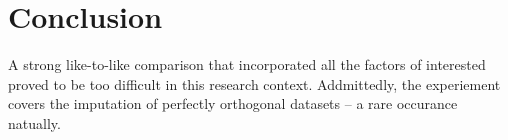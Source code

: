 \documentclass[../paper.tex]{subfiles}
\begin{document}
\section{Conclusion}

A strong like-to-like comparison that incorporated all the factors of interested proved to be too difficult in this research context.
Addmittedly, the experiement covers the imputation of perfectly orthogonal datasets -- a rare occurance natually.


\end{document}
